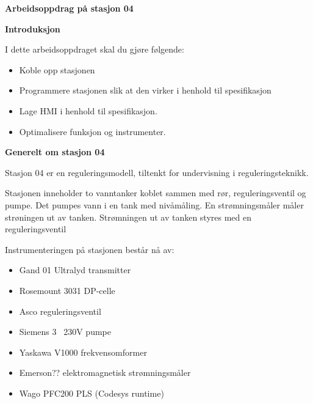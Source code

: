 \newpage


\begin{center}
\textbf{Arbeidsoppdrag på stasjon 04}
\vskip 5pt 
\vskip 5pt 
\end{center}

\vskip 10pt 
\textbf{Introduksjon}

\vskip 5pt 
I dette arbeidsoppdraget skal du gjøre følgende:
\begin{itemize}[noitemsep]
	\item Koble opp stasjonen 
	\item Programmere stasjonen slik at den virker i henhold til spesifikasjon
	\item Lage HMI i henhold til spesifikasjon. 
	\item Optimalisere funksjon og instrumenter. 
\end{itemize}

\textbf{Generelt om stasjon 04}
\vskip 5pt 

Stasjon 04 er en reguleringsmodell, tiltenkt for undervisning i reguleringsteknikk.  

\vskip 5pt 
Stasjonen inneholder to vanntanker koblet sammen med rør, reguleringsventil og pumpe. Det pumpes vann i en tank med nivåmåling. En strømningsmåler måler strøningen ut av tanken. Strømningen ut av tanken styres med en reguleringsventil

\vskip 5pt 
Instrumenteringen på stasjonen består nå av:  
\begin{itemize}[noitemsep]
	\item Gand 01 Ultralyd transmitter
	\item Rosemount 3031 DP-celle
	\item Asco reguleringsventil
	\item Siemens 3~ 230V pumpe
	\item Yaskawa V1000 frekvensomformer
	\item Emerson?? elektromagnetisk strømningsmåler
	\item Wago PFC200 PLS (Codesys runtime)
\end{itemize}

